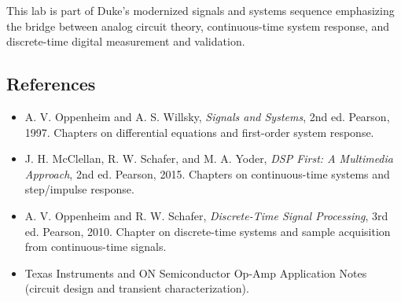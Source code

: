 \documentclass[11pt,letterpaper]{article}
\begin{document}
This lab is part of Duke's modernized signals and systems sequence emphasizing the bridge between analog circuit theory, continuous-time system response, and discrete-time digital measurement and validation.

\subsection*{References}

\begin{itemize}
    \item A. V. Oppenheim and A. S. Willsky, \textit{Signals and Systems}, 2nd ed. Pearson, 1997. Chapters on differential equations and first-order system response.
    \item J. H. McClellan, R. W. Schafer, and M. A. Yoder, \textit{DSP First: A Multimedia Approach}, 2nd ed. Pearson, 2015. Chapters on continuous-time systems and step/impulse response.
    \item A. V. Oppenheim and R. W. Schafer, \textit{Discrete-Time Signal Processing}, 3rd ed. Pearson, 2010. Chapter on discrete-time systems and sample acquisition from continuous-time signals.
    \item Texas Instruments and ON Semiconductor Op-Amp Application Notes (circuit design and transient characterization).
\end{itemize}
\end{document}
